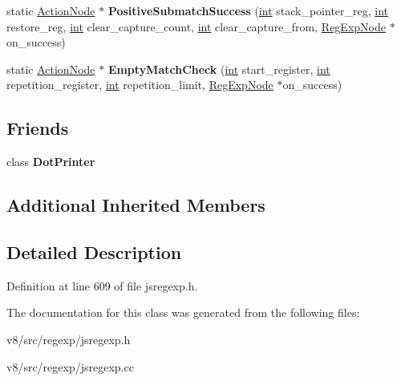 \begin{DoxyCompactItemize}
\item 
\mbox{\label{classv8_1_1internal_1_1ActionNode_a89bed32eadb39ad776f7e5523d8d152b}} 
static \mbox{\hyperlink{classv8_1_1internal_1_1ActionNode}{Action\+Node}} $\ast$ {\bfseries Positive\+Submatch\+Success} (\mbox{\hyperlink{classint}{int}} stack\+\_\+pointer\+\_\+reg, \mbox{\hyperlink{classint}{int}} restore\+\_\+reg, \mbox{\hyperlink{classint}{int}} clear\+\_\+capture\+\_\+count, \mbox{\hyperlink{classint}{int}} clear\+\_\+capture\+\_\+from, \mbox{\hyperlink{classv8_1_1internal_1_1RegExpNode}{Reg\+Exp\+Node}} $\ast$on\+\_\+success)
\item 
\mbox{\label{classv8_1_1internal_1_1ActionNode_a1f8492811dde72cce77b5b7f8d083292}} 
static \mbox{\hyperlink{classv8_1_1internal_1_1ActionNode}{Action\+Node}} $\ast$ {\bfseries Empty\+Match\+Check} (\mbox{\hyperlink{classint}{int}} start\+\_\+register, \mbox{\hyperlink{classint}{int}} repetition\+\_\+register, \mbox{\hyperlink{classint}{int}} repetition\+\_\+limit, \mbox{\hyperlink{classv8_1_1internal_1_1RegExpNode}{Reg\+Exp\+Node}} $\ast$on\+\_\+success)
\end{DoxyCompactItemize}
\subsection*{Friends}
\begin{DoxyCompactItemize}
\item 
\mbox{\label{classv8_1_1internal_1_1ActionNode_a9c19d4d6fc300c029ba554cbe4d3d2e0}} 
class {\bfseries Dot\+Printer}
\end{DoxyCompactItemize}
\subsection*{Additional Inherited Members}


\subsection{Detailed Description}


Definition at line 609 of file jsregexp.\+h.



The documentation for this class was generated from the following files\+:\begin{DoxyCompactItemize}
\item 
v8/src/regexp/jsregexp.\+h\item 
v8/src/regexp/jsregexp.\+cc\end{DoxyCompactItemize}

